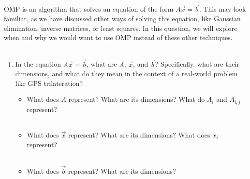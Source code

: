 \\ \\

OMP is an algorithm that solves an equation of the form $A\vec{x} = \vec{b}$.
This may look familiar, as we have discussed other ways of solving this equation,
like Gaussian elimination, inverse matrices, or least squares.
In this question, we will explore when and why we would want to use OMP instead of
these other techniques.
\\ \\

\begin{enumerate}
    \item In the equation $A\vec{x} = \vec{b}$, what are $A$, $\vec{x}$, and $\vec{b}$?
    Specifically, what are their dimensions, and what do they mean in the context of
    a real-world problem like GPS trilateration? 
    \begin{itemize}
        \item What does $A$ represent? What are its dimensions? What do $A_i$ and $A_{i,j}$ represent?
        \answerbox{0.5cm}
        \\ \\

        \item What does $\vec{x}$ represent? What are its dimensions? What does $x_i$ represent?
        \answerbox{0.5cm}
        \\ \\

        \item What does $\vec{b}$ represent? What are its dimensions?
        \answerbox{0.5cm}
        \\ \\
    \end{itemize}


\end{enumerate}
